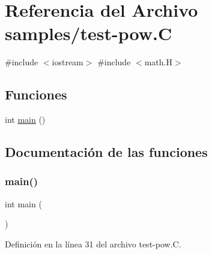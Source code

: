 \hypertarget{test-pow_8_c}{}\section{Referencia del Archivo samples/test-\/pow.C}
\label{test-pow_8_c}
{\ttfamily \#include $<$iostream$>$}\newline
{\ttfamily \#include $<$math.\+H$>$}\newline
\subsection*{Funciones}
\begin{DoxyCompactItemize}
\item 
int \hyperlink{test-pow_8_c_ae66f6b31b5ad750f1fe042a706a4e3d4}{main} ()
\end{DoxyCompactItemize}


\subsection{Documentación de las funciones}
\mbox{\label{test-pow_8_c_ae66f6b31b5ad750f1fe042a706a4e3d4}} 
\subsubsection{\texorpdfstring{main()}{main()}}
{\footnotesize\ttfamily int main (\begin{DoxyParamCaption}{ }\end{DoxyParamCaption})}



Definición en la línea 31 del archivo test-\/pow.\+C.

